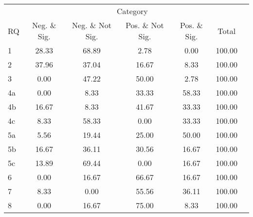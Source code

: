 \begin{tabular}{lcccccc}
\hline
\hline
 & \multicolumn{5}{c}{Category} \\
RQ&Neg. \& Sig.&Neg. \& Not Sig.&Pos. \& Not Sig.&Pos. \& Sig.&Total \\
%
\hline
1&28.33&68.89&2.78&0.00&100.00 \\
2&37.96&37.04&16.67&8.33&100.00 \\
3&0.00&47.22&50.00&2.78&100.00 \\
4a&0.00&8.33&33.33&58.33&100.00 \\
4b&16.67&8.33&41.67&33.33&100.00 \\
4c&8.33&58.33&0.00&33.33&100.00 \\
5a&5.56&19.44&25.00&50.00&100.00 \\
5b&16.67&36.11&30.56&16.67&100.00 \\
5c&13.89&69.44&0.00&16.67&100.00 \\
6&0.00&16.67&66.67&16.67&100.00 \\
7&8.33&0.00&55.56&36.11&100.00 \\
8&0.00&16.67&75.00&8.33&100.00 \\
\hline
\hline
\end{tabular}
